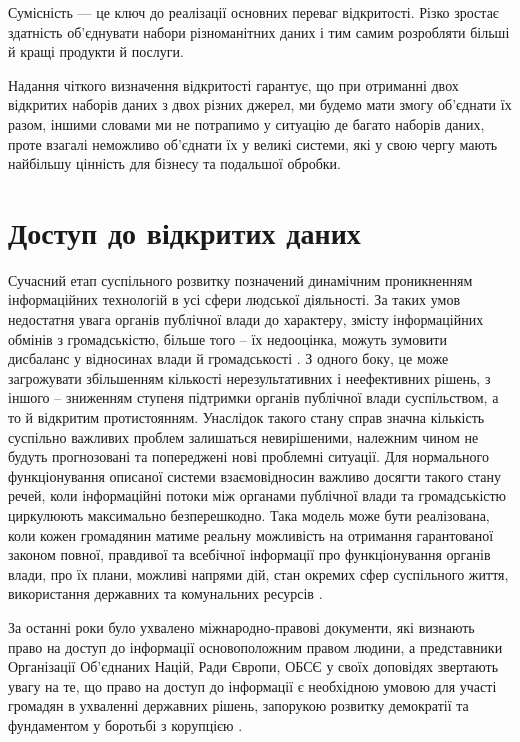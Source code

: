Сумісність — це ключ до реалізації основних переваг
відкритості. Різко зростає здатність об'єднувати набори
різноманітних даних і тим самим розробляти більші й кращі
продукти й послуги.

Надання чіткого визначення відкритості гарантує, що при отриманні
двох відкритих наборів даних з двох різних джерел, ми будемо мати
змогу об'єднати їх разом, іншими словами ми не потрапимо у ситуацію
де багато наборів даних, проте взагалі неможливо об'єднати їх у великі
системи, які у свою чергу мають найбільшу цінність для бізнесу та подальшої обробки.

\section{Доступ до відкритих даних}

Сучасний етап суспільного розвитку позначений динамічним
проникненням інформаційних технологій в усі сфери людської
діяльності. За таких умов недостатня увага органів публічної влади
до характеру, змісту інформаційних обмінів з громадськістю, більше
того – їх недооцінка, можуть зумовити дисбаланс у відносинах влади
й громадськості \cite{TheGlobalImpact}.
З одного боку, це може загрожувати збільшенням
кількості нерезультативних і неефективних рішень, з іншого –
зниженням ступеня підтримки органів публічної влади суспільством, а
то й відкритим протистоянням. Унаслідок такого стану справ значна
кількість суспільно важливих проблем залишаться невирішеними,
належним чином не будуть прогнозовані та попереджені нові проблемні ситуації.
Для нормального функціонування описаної системи взаємовідносин важливо
досягти такого стану речей, коли інформаційні
потоки між органами публічної влади та громадськістю циркулюють
максимально безперешкодно. Така модель може бути реалізована,
коли кожен громадянин матиме реальну можливість на отримання
гарантованої законом повної, правдивої та всебічної інформації про
функціонування органів влади, про їх плани, можливі напрями дій,
стан окремих сфер суспільного життя, використання державних та
комунальних ресурсів \cite{FakeOpenDataEcosystem}.

За останні роки було ухвалено міжнародно-правові документи,
які визнають право на доступ до інформації основоположним правом
людини, а представники Організації Об’єднаних Націй, Ради Європи,
ОБСЄ у своїх доповідях звертають увагу на те, що право на доступ
до інформації є необхідною умовою для участі громадян в ухваленні
державних рішень, запорукою розвитку демократії та фундаментом у
боротьбі з корупцією \cite{EGAPOpenDataBook}.


